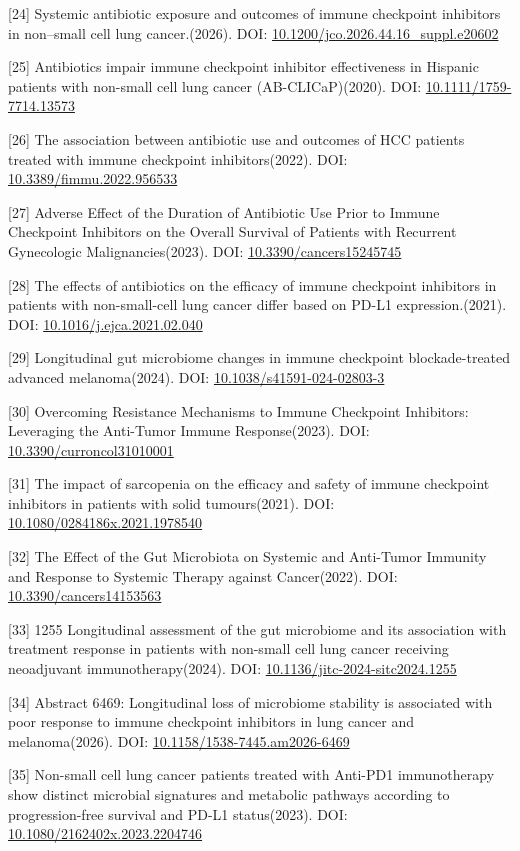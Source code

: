 {[}24{]} Systemic antibiotic exposure and outcomes of immune checkpoint inhibitors in non--small cell lung cancer.(2026). DOI: \url{10.1200/jco.2026.44.16_suppl.e20602}

{[}25{]} Antibiotics impair immune checkpoint inhibitor effectiveness in Hispanic patients with non-small cell lung cancer (AB-CLICaP)(2020). DOI: \url{10.1111/1759-7714.13573}

{[}26{]} The association between antibiotic use and outcomes of HCC patients treated with immune checkpoint inhibitors(2022). DOI: \url{10.3389/fimmu.2022.956533}

{[}27{]} Adverse Effect of the Duration of Antibiotic Use Prior to Immune Checkpoint Inhibitors on the Overall Survival of Patients with Recurrent Gynecologic Malignancies(2023). DOI: \url{10.3390/cancers15245745}

{[}28{]} The effects of antibiotics on the efficacy of immune checkpoint inhibitors in patients with non-small-cell lung cancer differ based on PD-L1 expression.(2021). DOI: \url{10.1016/j.ejca.2021.02.040}

{[}29{]} Longitudinal gut microbiome changes in immune checkpoint blockade-treated advanced melanoma(2024). DOI: \url{10.1038/s41591-024-02803-3}

{[}30{]} Overcoming Resistance Mechanisms to Immune Checkpoint Inhibitors: Leveraging the Anti-Tumor Immune Response(2023). DOI: \url{10.3390/curroncol31010001}

{[}31{]} The impact of sarcopenia on the efficacy and safety of immune checkpoint inhibitors in patients with solid tumours(2021). DOI: \url{10.1080/0284186x.2021.1978540}

{[}32{]} The Effect of the Gut Microbiota on Systemic and Anti-Tumor Immunity and Response to Systemic Therapy against Cancer(2022). DOI: \url{10.3390/cancers14153563}

{[}33{]} 1255 Longitudinal assessment of the gut microbiome and its association with treatment response in patients with non-small cell lung cancer receiving neoadjuvant immunotherapy(2024). DOI: \url{10.1136/jitc-2024-sitc2024.1255}

{[}34{]} Abstract 6469: Longitudinal loss of microbiome stability is associated with poor response to immune checkpoint inhibitors in lung cancer and melanoma(2026). DOI: \url{10.1158/1538-7445.am2026-6469}

{[}35{]} Non-small cell lung cancer patients treated with Anti-PD1 immunotherapy show distinct microbial signatures and metabolic pathways according to progression-free survival and PD-L1 status(2023). DOI: \url{10.1080/2162402x.2023.2204746}

